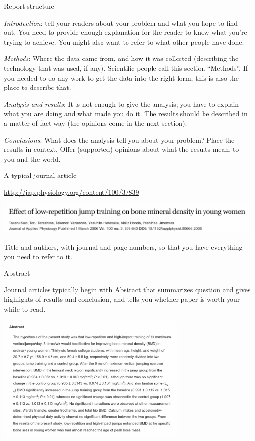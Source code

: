 \documentclass[
  ignorenonframetext,
]{beamer}
\begin{document}
\begin{frame}{Report structure}
\protect\hypertarget{report-structure}{}

\emph{Introduction}: tell your readers about your problem and what you
hope to find out. You need to provide enough explanation for the reader
to know what you're trying to achieve. You might also want to refer to
what other people have done.

\emph{Methods}: Where the data came from, and how it was collected
(describing the technology that was used, if any). Scientific people
call this section ``Methods''. If you needed to do any work to get the
data into the right form, this is also the place to describe that.

\emph{Analysis and results}: It is not enough to give the analysis; you
have to explain what you are doing and what made you do it. The results
should be described in a matter-of-fact way (the opinions come in the
next section).

\emph{Conclusions}: What does the analysis tell you about your problem?
Place the results in context. Offer (supported) opinions about what the
results mean, to you and the world.

\end{frame}

\begin{frame}{A typical journal article}
\protect\hypertarget{a-typical-journal-article}{}

\url{http://jap.physiology.org/content/100/3/839}

\includegraphics[width=\textwidth]{titlebar}

Title and authors, with journal and page numbers, so that you have
everything you need to refer to it.

\end{frame}

\begin{frame}{Abstract}
\protect\hypertarget{abstract}{}

Journal articles typically begin with Abstract that summarizes question
and gives highlights of results and conclusion, and tells you whether
paper is worth your while to read.

\includegraphics[width=0.7\textwidth]{abstract}

\end{frame}
\end{document}
